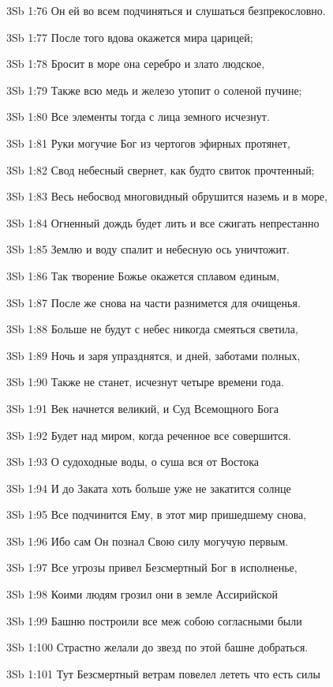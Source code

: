 \vs 3Sb 1:76 Он ей во всем подчиняться и слушаться безпрекословно. 

\vs 3Sb 1:77 После того вдова окажется мира царицей; 

\vs 3Sb 1:78 Бросит в море она серебро и злато людское, 

\vs 3Sb 1:79 Также всю медь и железо утопит о соленой пучине;

\vs 3Sb 1:80 Все элементы тогда с лица земного исчезнут. 

\vs 3Sb 1:81 Руки могучие Бог из чертогов эфирных протянет, 

\vs 3Sb 1:82 Свод небесный свернет, как будто свиток прочтенный; 

\vs 3Sb 1:83 Весь небосвод многовидный обрушится наземь и в море, 

\vs 3Sb 1:84 Огненный дождь будет лить и все сжигать непрестанно 

\vs 3Sb 1:85 Землю и воду спалит и небесную ось уничтожит. 

\vs 3Sb 1:86 Так творение Божье окажется сплавом единым, 

\vs 3Sb 1:87 После же снова на части разнимется для очищенья. 

\vs 3Sb 1:88 Больше не будут с небес никогда смеяться светила, 

\vs 3Sb 1:89 Ночь и заря упразднятся, и дней, заботами полных,

\vs 3Sb 1:90 Также не станет, исчезнут четыре времени года. 

\vs 3Sb 1:91 Век начнется великий, и Суд Всемощного Бога 

\vs 3Sb 1:92 Будет над миром, когда реченное все совершится.

\vs 3Sb 1:93 О судоходные воды, о суша вся от Востока 

\vs 3Sb 1:94 И до Заката  хоть больше уже не закатится солнце  

\vs 3Sb 1:95 Все подчинится Ему, в этот мир пришедшему снова, 

\vs 3Sb 1:96 Ибо сам Он познал Свою силу могучую первым.

\vs 3Sb 1:97 Все угрозы привел Безсмертный Бог в исполненье, 

\vs 3Sb 1:98 Коими людям грозил  они в земле Ассирийской 

\vs 3Sb 1:99 Башню построили  все меж собою согласными были  

\vs 3Sb 1:100 Страстно желали до звезд по этой башне добраться. 

\vs 3Sb 1:101 Тут Безсмертный ветрам повелел лететь что есть силы 

